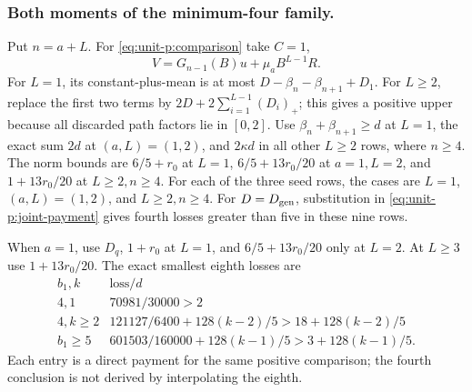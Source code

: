 \subsubsection{Both moments of the minimum-four family.}\label{part:unit-p:minimum-four-payments}
Put \(n=a+L\). For \eqref{eq:unit-p:comparison} take \(C=1\),
\[
 V=G_{n-1}(B)u+\mu_aB^{L-1}R .
\]
For \(L=1\), its constant-plus-mean is at most
\(D-\beta_n-\beta_{n+1}+D_1\).
For \(L\ge2\), replace the first two terms by
\(2D+2\sum_{i=1}^{L-1}(D_i)_+\); this gives a positive upper
because all discarded path factors lie in \([0,2]\).
Use \(\beta_{n}+\beta_{n+1}\ge d\) at \(L=1\), the exact sum
\(2d\) at \((a,L)=(1,2)\), and \(2\kappa d\) in all other
\(L\ge2\) rows, where \(n\ge4\).
The norm bounds are \(6/5+r_0\) at \(L=1\),
\(6/5+13r_0/20\) at \(a=1,L=2\), and
\(1+13r_0/20\) at \(L\ge2,n\ge4\).
For each of the three seed rows, the cases are \(L=1\),
\((a,L)=(1,2)\), and \(L\ge2,n\ge4\).
For \(D=D_{\rm gen}\), substitution in
\eqref{eq:unit-p:joint-payment} gives fourth losses greater than
five in these nine rows.

When \(a=1\), use \(D_q\), \(1+r_0\) at \(L=1\), and
\(6/5+13r_0/20\) only at \(L=2\). At \(L\ge3\) use
\(1+13r_0/20\). The exact smallest eighth losses are
\begin{equation}\label{eq:unit-p:data-4}
\begin{array}{c|c}
 b_1,k&\text{loss}/d\\\hline
 4,1&70981/30000>2\\
 4,k\ge2&121127/6400+128(k-2)/5>18+128(k-2)/5\\
 b_1\ge5&601503/160000+128(k-1)/5>3+128(k-1)/5 .
\end{array}
\end{equation}
Each entry is a direct payment for the same positive comparison;
the fourth conclusion is not derived by interpolating the eighth.


